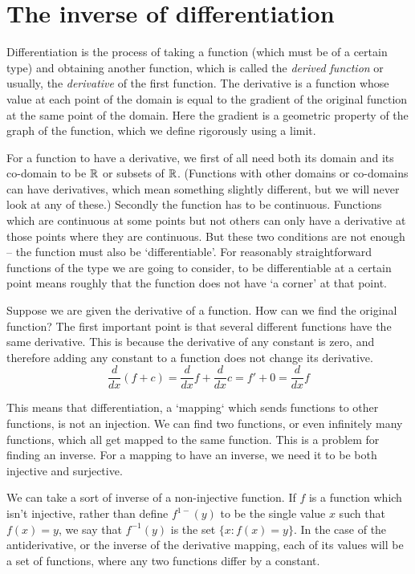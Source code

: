 \chapter{The inverse of differentiation}
Differentiation is the process of taking a function (which must be of a certain type) and obtaining another function, which is called the \emph{derived function} or usually, the \emph{derivative} of the first function. The derivative is a function whose value at each point of the domain is equal to the gradient of the original function at the same point of the domain. Here the gradient is a geometric property of the graph of the function, which we define rigorously using a limit.

For a function to have a derivative, we first of all need both its domain and its co-domain to be $\mathbb{R}$ or subsets of $\mathbb{R}$. (Functions with other domains or co-domains can have derivatives, which mean something slightly different, but we will never look at any of these.) Secondly the function has to be continuous. Functions which are continuous at some points but not others can only have a derivative at those points where they are continuous. But these two conditions are not enough -- the function must also be `differentiable'. For reasonably straightforward functions of the type we are going to consider, to be differentiable at a certain point  means roughly that the function does not have `a corner' at that point.

Suppose we are given the derivative of a function. How can we find the original function? The first important point is that several different functions have the same derivative. This is because the derivative of any constant is zero, and therefore adding any constant to a function does not change its derivative. 
\[ \frac{d}{dx}(f + c) = \frac{d}{dx}f + \frac{d}{dx}c = f' + 0 = \frac{d}{dx}f \] 

This means that differentiation, a `mapping` which sends functions to other functions, is not an injection. We can find two functions, or even infinitely many functions, which all get mapped to the same function. This is a problem for finding an inverse. For a mapping to have an inverse, we need it to be both injective and surjective. 

We can take a sort of inverse of a non-injective function. If $f$ is a function which isn't injective, rather than define $f^{1-}(y)$ to be the single value $x$ such that $f(x) = y$, we say that $f^{-1}(y)$ is the set $\{ x : f(x) = y \}$.  In the case of the antiderivative, or the inverse of the derivative mapping, each of its values will be a set of functions, where any two functions differ by a constant.

